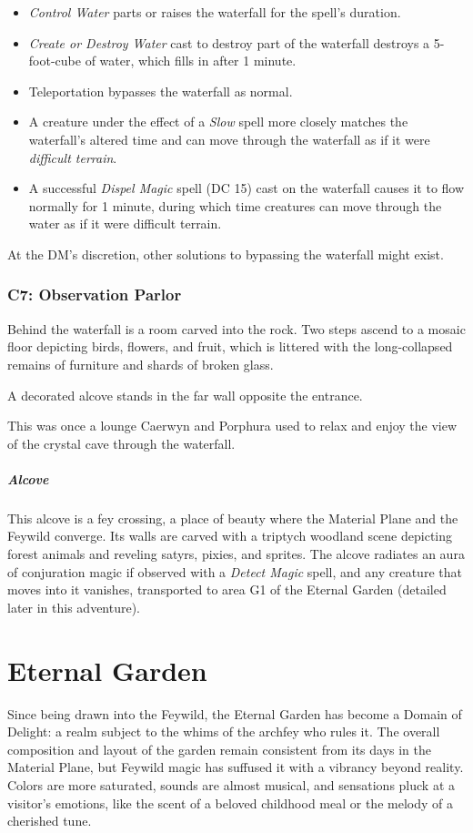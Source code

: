 \documentclass[10pt,a4paper,twoside,bg=print,twocolumn,openany,nodeprecatedcode]{dndbook}
\begin{document}
\begin{itemize}
\item \textit{Control Water} parts or raises the waterfall for the spell's duration.
\item \textit{Create or Destroy Water} cast to destroy part of the waterfall destroys a 5-foot-cube of water, which fills in after 1 minute.
\item Teleportation bypasses the waterfall as normal.
\item A creature under the effect of a \textit{Slow} spell more closely matches the waterfall's altered time and can move through the waterfall as if it were \textit{difficult terrain}.
\item A successful \textit{Dispel Magic} spell (DC 15) cast on the waterfall causes it to flow normally for 1 minute, during which time creatures can move through the water as if it were difficult terrain.
\end{itemize}

At the DM's discretion, other solutions to bypassing the waterfall might exist.

\subsubsection{C7: Observation Parlor}
\begin{DndReadAloud}{}
Behind the waterfall is a room carved into the rock. Two steps ascend to a mosaic floor depicting birds, flowers, and fruit, which is littered with the long-collapsed remains of furniture and shards of broken glass.

A decorated alcove stands in the far wall opposite the entrance.

\end{DndReadAloud}

This was once a lounge Caerwyn and Porphura used to relax and enjoy the view of the crystal cave through the waterfall.

\subparagraph{Alcove}
This alcove is a fey crossing, a place of beauty where the Material Plane and the Feywild converge. Its walls are carved with a triptych woodland scene depicting forest animals and reveling satyrs, pixies, and sprites. The alcove radiates an aura of conjuration magic if observed with a \textit{Detect Magic} spell, and any creature that moves into it vanishes, transported to area G1 of the Eternal Garden (detailed later in this adventure).

\section{Eternal Garden}
Since being drawn into the Feywild, the Eternal Garden has become a Domain of Delight: a realm subject to the whims of the archfey who rules it. The overall composition and layout of the garden remain consistent from its days in the Material Plane, but Feywild magic has suffused it with a vibrancy beyond reality. Colors are more saturated, sounds are almost musical, and sensations pluck at a visitor's emotions, like the scent of a beloved childhood meal or the melody of a cherished tune.
\end{document}
